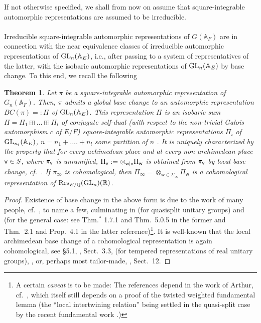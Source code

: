 \documentclass[a4paper,10pt]{amsart}
\newtheorem{thm}[equation]{Theorem}
\theoremstyle{definition}
\numberwithin{equation}{section}
\def\R{\mathbb R}
\def\A{\mathbb A}
\def\Q{\mathbb Q}
\def\Res{{\rm Res}}
\def\ww{\mathsf w}
\def\GL{{\rm GL}}
\def\vv{{\sf v}} %
\begin{document}
If not otherwise specified, we shall from now on assume that square-integrable automorphic representations are assumed to be irreducible.\\\\
Irreducible square-integrable automorphic representations of $G(\A_F)$ are in connection with the near equivalence classes of irreducible automorphic representations of $\GL_n(\A_E)$, i.e., after passing to a system of representatives of the latter, with the isobaric automorphic representations of $\GL_n(\A_E)$ by base change. To this end, we recall the following

\begin{thm}\label{thm:lift}
Let $\pi$ be a square-integrable automorphic representation of $G_n(\A_F)$. Then, $\pi$ admits a global {\it base change} to an automorphic representation $BC(\pi) =: \Pi$ of $\GL_n(\A_E)$. This representation $\Pi$ is an isobaric sum $\Pi=\Pi_1\boxplus...\boxplus\Pi_l$ of conjugate self-dual (with respect to the non-trivial Galois automorphism $c$ of $E/F$) square-integrable automorphic representations $\Pi_i$ of $\GL_{n_i}(\A_E)$, $n=n_1+....+n_l$ some partition of $n$ . It is uniquely characterized by the property that for every achimedean place and at every non-archimedean place $\vv\in S$, where $\pi_\vv$ is unramified, $\Pi_\vv:=\otimes_{{\sf w} | {\sf v}}\Pi_{\sf w}$ is obtained from $\pi_\vv$ by local base change, cf.\ \cite[Prop.\ 1.3.3]{KMSW}. If $\pi_\infty$ is cohomological, then $\Pi_\infty=\otimes_{\ww\in \Sigma_\infty}\Pi_\ww$ is a cohomological representation of $\Res_{E/\Q}(\GL_n)(\R)$. 
\end{thm}
\begin{proof}
Existence of base change in the above form is due to the work of many people, cf.\ \cite{lab, harris-labesse, kim-krish04, kim-krish05, morel, shin, ckpssh}, to name a few, culminating in \cite{mok} (for quasisplit unitary groups) and \cite{KMSW, zou} (for the general case: see Thm$.^*$ 1.7.1 and Thm.\ 5.0.5 in the former and Thm.\ 2.1 and Prop.\ 4.1 in the latter reference)\footnote{A certain {\it caveat} is to be made: The references \cite{mok, KMSW, zou} depend in the work of Arthur, cf.\ \cite{arthur}, which itself still depends on a proof of the twisted weighted fundamental lemma (the ``local intertwining relation'' being settled in the quasi-split case by the recent fundamental work \cite{AGIKMS}.)}. It is well-known that the local archimedean base change of a cohomological representation is again cohomological, see \cite{lab} \S 5.1, \cite{clozelihes}, Sect.\ 3.3, (for tempered representations of real unitary groups), \cite{johnson}, or, perhaps most tailor-made, \cite{nairprasad}, Sect.\ 12.
\end{proof}
\end{document}
